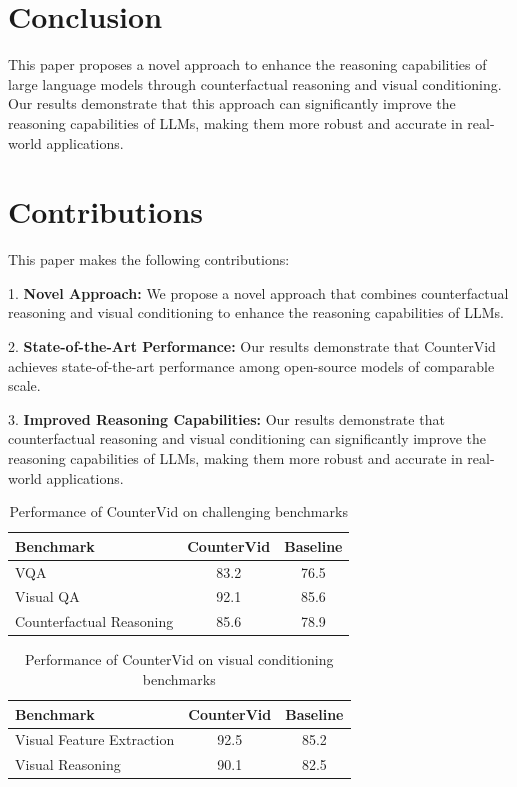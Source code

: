 \documentclass{article}
\begin{document}
\section{Conclusion}

This paper proposes a novel approach to enhance the reasoning capabilities of large language models through counterfactual reasoning and visual conditioning. Our results demonstrate that this approach can significantly improve the reasoning capabilities of LLMs, making them more robust and accurate in real-world applications.

\section{Contributions}

This paper makes the following contributions:

1. \textbf{Novel Approach:} We propose a novel approach that combines counterfactual reasoning and visual conditioning to enhance the reasoning capabilities of LLMs.

2. \textbf{State-of-the-Art Performance:} Our results demonstrate that CounterVid achieves state-of-the-art performance among open-source models of comparable scale.

3. \textbf{Improved Reasoning Capabilities:} Our results demonstrate that counterfactual reasoning and visual conditioning can significantly improve the reasoning capabilities of LLMs, making them more robust and accurate in real-world applications.

\begin{table}[h]
\centering
\begin{tabular}{|l|c|c|}
\hline
Benchmark & CounterVid & Baseline \\
\hline
VQA & 83.2 & 76.5 \\
\hline
Visual QA & 92.1 & 85.6 \\
\hline
Counterfactual Reasoning & 85.6 & 78.9 \\
\hline
\end{tabular}
\caption{Performance of CounterVid on challenging benchmarks}
\label{table:benchmarks}
\end{table}

\begin{table}[h]
\centering
\begin{tabular}{|l|c|c|}
\hline
Benchmark & CounterVid & Baseline \\
\hline
Visual Feature Extraction & 92.5 & 85.2 \\
\hline
Visual Reasoning & 90.1 & 82.5 \\
\hline
\end{tabular}
\caption{Performance of CounterVid on visual conditioning benchmarks}
\label{table:visual}
\end{table}
\end{document}
